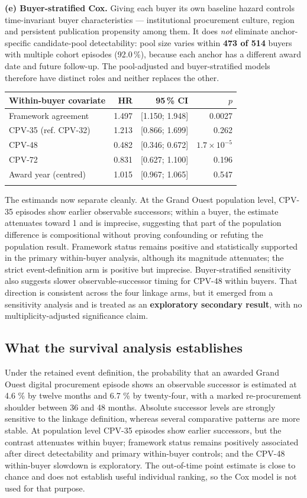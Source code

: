 \textbf{(e) Buyer-stratified Cox.} Giving each buyer its own baseline hazard controls time-invariant buyer characteristics --- institutional procurement culture, region and persistent publication propensity among them. It does \emph{not} eliminate anchor-specific candidate-pool detectability: pool size varies within \textbf{473 of 514} buyers with multiple cohort episodes (92.0\,\%), because each anchor has a different award date and future follow-up. The pool-adjusted and buyer-stratified models therefore have distinct roles and neither replaces the other.

\begingroup\footnotesize
\begin{longtable}[]{@{}lrrr@{}}
\toprule\noalign{}
Within-buyer covariate & HR & 95\,\% CI & $p$ \\
\midrule\noalign{}
\endhead
Framework agreement & 1.497 & {[}1.150; 1.948{]} & 0.0027 \\
CPV-35 (ref. CPV-32) & 1.213 & {[}0.866; 1.699{]} & 0.262 \\
CPV-48 & 0.482 & {[}0.346; 0.672{]} & $1.7\times10^{-5}$ \\
CPV-72 & 0.831 & {[}0.627; 1.100{]} & 0.196 \\
Award year (centred) & 1.015 & {[}0.967; 1.065{]} & 0.547 \\
\bottomrule\noalign{}
\end{longtable}
\endgroup

The estimands now separate cleanly. At the Grand Ouest population level, CPV-35 episodes show earlier observable successors; within a buyer, the estimate attenuates toward 1 and is imprecise, suggesting that part of the population difference is compositional without proving confounding or refuting the population result. Framework status remains positive and statistically supported in the primary within-buyer analysis, although its magnitude attenuates; the strict event-definition arm is positive but imprecise. Buyer-stratified sensitivity also suggests slower observable-successor timing for CPV-48 within buyers. That direction is consistent across the four linkage arms, but it emerged from a sensitivity analysis and is treated as an \textbf{exploratory secondary result}, with no multiplicity-adjusted significance claim.

\subsection{What the survival analysis establishes}

Under the retained event definition, the probability that an awarded Grand Ouest digital procurement episode shows an observable successor is estimated at 4.6 \% by twelve months and 6.7 \% by twenty-four, with a marked re-procurement shoulder between 36 and 48 months. Absolute successor levels are strongly sensitive to the linkage definition, whereas several comparative patterns are more stable. At population level CPV-35 episodes show earlier successors, but the contrast attenuates within buyer; framework status remains positively associated after direct detectability and primary within-buyer controls; and the CPV-48 within-buyer slowdown is exploratory. The out-of-time point estimate is close to chance and does not establish useful individual ranking, so the Cox model is not used for that purpose.
